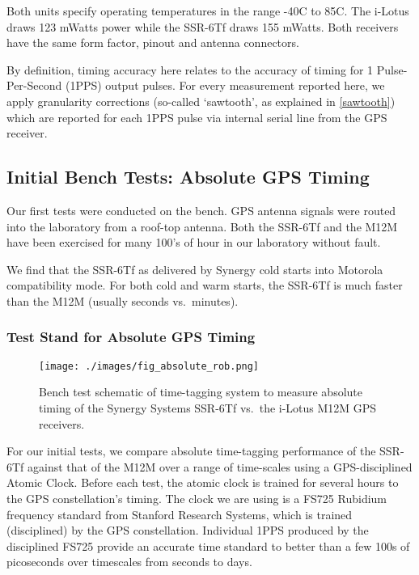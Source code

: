 Both units specify operating temperatures in the range -40C to 85C.
The i-Lotus draws 123 mWatts power while the SSR-6Tf draws 155 mWatts.
Both receivers have the same form factor, pinout and antenna
connectors.

By definition, timing accuracy here relates to the accuracy of timing for
1 Pulse-Per-Second (1PPS) output pulses. For every measurement reported
here, we apply granularity corrections (so-called `sawtooth', as explained in \autoref{sawtooth})
which are reported for each 1PPS pulse via internal serial line from the GPS
receiver.

\subsection{Initial Bench Tests:  Absolute GPS Timing}

Our first tests were conducted on the bench.  GPS antenna signals were routed into the
laboratory from a roof-top antenna.  Both the SSR-6Tf and the M12M have been exercised
for many 100's of hour in our laboratory without fault.

We find that the SSR-6Tf as delivered by Synergy cold starts into
Motorola compatibility mode.  For both cold and warm starts, the
SSR-6Tf is much faster than the M12M (usually seconds vs.~minutes).

\subsubsection{Test Stand for Absolute GPS Timing} 

\label{timprime}
\begin{figure}[h!]
\centering
\texttt{[image: ./images/fig\_absolute\_rob.png]}
\caption[Absolute Timing Test Diagram]{Bench test schematic of time-tagging system to measure absolute timing of the Synergy Systems SSR-6Tf vs.~the i-Lotus M12M GPS receivers.}
\label{fig_absolute}
\end{figure}
For our initial tests, we compare absolute time-tagging performance of
the SSR-6Tf against that of the M12M over a range of time-scales using
a GPS-disciplined Atomic Clock.  Before each test, the atomic clock is
trained for several hours to the GPS constellation's timing. The clock
we are using is a FS725 Rubidium frequency standard from Stanford
Research Systems, which is trained (disciplined) by the GPS constellation.
Individual 1PPS produced by the disciplined FS725 provide an accurate
time standard to better than a few 100s of picoseconds over timescales
from seconds to days.


